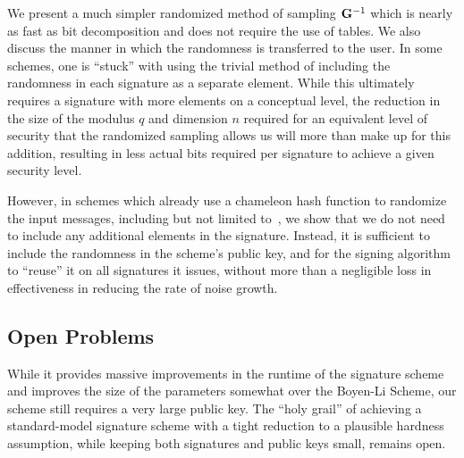 We present a much simpler randomized method of sampling $\mathbf{G}^{-1}$ which is nearly as fast as bit decomposition and does not require the use of tables. We also discuss the manner 
in which the randomness is transferred to the user. In some schemes, one is ``stuck'' with using the trivial method of including the randomness in each signature as a separate element. While this ultimately requires a signature with more elements on a conceptual level, the reduction in the size of the modulus $q$ and dimension $n$ required for an equivalent level of security that the randomized sampling allows us will more than make up for this addition, resulting in less actual bits required per signature to achieve a given security level.

However, in schemes which already use a chameleon hash function to
randomize the input messages, including but not limited
to~\cite{DBLP:conf/pkc/Alperin-Sheriff15,DBLP:conf/eurocrypt/MicciancioP12,DBLP:conf/pkc/Boyen10,DBLP:conf/crypto/DucasM14},
we show that we do not need to include any additional elements in the
signature. Instead, it is sufficient to include the randomness in the
scheme's public key, and for the signing algorithm to ``reuse'' it on
all signatures it issues, without more than a negligible loss in
effectiveness in reducing the rate of noise growth.

\subsection{Open Problems}
\label{sec:open-probs}
While it provides massive improvements in the runtime of the signature scheme and improves the size of the parameters somewhat over the Boyen-Li Scheme, our scheme still requires a very large public key. The ``holy grail'' of achieving a standard-model signature scheme  with a tight reduction to a plausible hardness assumption, while keeping both signatures and public keys small, remains open. 



